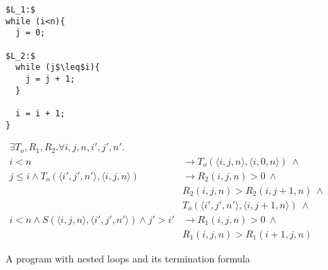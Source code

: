 \documentclass[preprint]{sigplanconf}
\theoremstyle{definition}
\begin{document}
\begin{figure*}
\begin{framed}
\begin{minipage}{0.17\textwidth}
\begin{lstlisting}[mathescape=true]
$L_1:$
while (i<n){
  j = 0;

$L_2:$
  while (j$\leq$i){
    j = j + 1;
  }

  i = i + 1;
}
\end{lstlisting}
\end{minipage}
\vline
\begin{minipage}{0.82\textwidth}
\begin{align*}
 \exists T_o, R_1, R_2 . \forall i, j, n, i', j', n' . \\
   i < n & \rightarrow T_o(\langle i, j, n \rangle , \langle i, 0, n \rangle) ~ \wedge \\
   j \leq i \wedge T_o(\langle i', j', n' \rangle, \langle i, j, n\rangle ) & \rightarrow R_2(i, j, n) > 0 ~ \wedge \\
     & R_2(i, j, n) > R_2(i, j+1, n) ~ \wedge \\
     & T_o(\langle i', j', n' \rangle, \langle i, j+1, n \rangle) ~ \wedge \\
   i < n \wedge S(\langle i, j, n \rangle, \langle i', j', n' \rangle) \wedge j' > i' & \rightarrow R_1(i, j, n) > 0 ~ \wedge \\
                                         & R_1(i, j, n) > R_1(i+1, j, n)
   \end{align*}
\end{minipage}
\end{framed}
\caption{A program with nested loops and its termination formula\label{fig:environment-model}}
\end{figure*}
\end{document}
